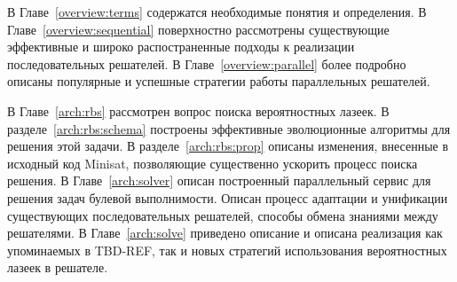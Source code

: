В Главе~\ref{overview:terms} содержатся необходимые понятия и определения. В 
Главе~\ref{overview:sequential} поверхностно рассмотрены существующие эффективные и широко
распостраненные подходы к реализации последовательных решателей. В Главе~\ref{overview:parallel}
более подробно описаны популярные и успешные стратегии работы параллельных решателей.

В Главе~\ref{arch:rbs} рассмотрен вопрос поиска вероятностных лазеек. В разделе~\ref{arch:rbs:schema}
построены эффективные эволюционные алгоритмы для решения этой задачи. В разделе~\ref{arch:rbs:prop}
описаны изменения, внесенные в исходный код Minisat, позволяющие существенно ускорить процесс поиска решения.
В Главе~\ref{arch:solver} описан построенный параллельный сервис для решения задач булевой
выполнимости. Описан процесс адаптации и унификации существующих последовательных решателей,
способы обмена знаниями между решателями.
В Главе~\ref{arch:solve} приведено описание и описана реализация как упоминаемых в TBD-REF,
так и новых стратегий использования вероятностных лазеек в решателе.

